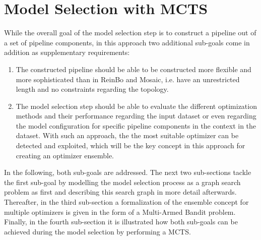 \section{Model Selection with MCTS}
\label{sec:approach:selection}
While the overall goal of the model selection step is to construct a pipeline out of a set of pipeline components, in this approach two additional sub-goals come in addition as supplementary requirements:
\begin{enumerate}
    \item The constructed pipeline should be able to be constructed more flexible and more sophisticated than in ReinBo and Mosaic, i.e. have an unrestricted length and no constraints regarding the topology.
    \item The model selection step should be able to evaluate the different optimization methods and their performance regarding the input dataset or even regarding the model configuration for specific pipeline components in the context in the dataset.
    With such an approach, the the most suitable optimizer can be detected and exploited, which will be the key concept in this approach for creating an optimizer ensemble.
\end{enumerate}
In the following, both sub-goals are addressed.
The next two sub-sections tackle the first sub-goal by modelling the model selection process as a graph search problem as first and describing this search graph in more detail afterwards.
Thereafter, in the third sub-section a formalization of the ensemble concept for multiple optimizers is given in the form of a Multi-Armed Bandit problem.
Finally, in the fourth sub-section it is illustrated how both sub-goals can be achieved during the model selection by performing a MCTS.

